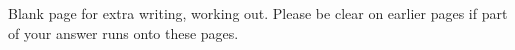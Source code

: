 \documentclass[
  12pt,
  letterpaper,
  DIV=11,
  numbers=noendperiod]{scrartcl}
\begin{document}
\vspace{0.3cm} \dotfill

\vspace{0.3cm} \dotfill

\vspace{0.3cm} \dotfill

\vspace{0.3cm} \dotfill

\vspace{0.3cm} \dotfill

\vspace{0.3cm} \dotfill

\vspace{0.3cm} \dotfill

\vspace{0.3cm} \dotfill

\vspace{0.3cm} \dotfill

\newpage

Blank page for extra writing, working out. Please be clear on earlier
pages if part of your answer runs onto these pages.
\end{document}
